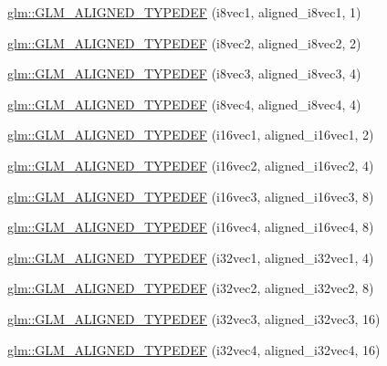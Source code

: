 \begin{DoxyCompactItemize}
\item 
\hyperlink{group__gtx__type__aligned_ga9ec20fdfb729c702032da9378c79679f}{glm\-::\-G\-L\-M\-\_\-\-A\-L\-I\-G\-N\-E\-D\-\_\-\-T\-Y\-P\-E\-D\-E\-F} (i8vec1, aligned\-\_\-i8vec1, 1)
\item 
\hyperlink{group__gtx__type__aligned_ga25b3fe1d9e8d0a5e86c1949c1acd8131}{glm\-::\-G\-L\-M\-\_\-\-A\-L\-I\-G\-N\-E\-D\-\_\-\-T\-Y\-P\-E\-D\-E\-F} (i8vec2, aligned\-\_\-i8vec2, 2)
\item 
\hyperlink{group__gtx__type__aligned_ga2958f907719d94d8109b562540c910e2}{glm\-::\-G\-L\-M\-\_\-\-A\-L\-I\-G\-N\-E\-D\-\_\-\-T\-Y\-P\-E\-D\-E\-F} (i8vec3, aligned\-\_\-i8vec3, 4)
\item 
\hyperlink{group__gtx__type__aligned_ga1fe6fc032a978f1c845fac9aa0668714}{glm\-::\-G\-L\-M\-\_\-\-A\-L\-I\-G\-N\-E\-D\-\_\-\-T\-Y\-P\-E\-D\-E\-F} (i8vec4, aligned\-\_\-i8vec4, 4)
\item 
\hyperlink{group__gtx__type__aligned_gaa4161e7a496dc96972254143fe873e55}{glm\-::\-G\-L\-M\-\_\-\-A\-L\-I\-G\-N\-E\-D\-\_\-\-T\-Y\-P\-E\-D\-E\-F} (i16vec1, aligned\-\_\-i16vec1, 2)
\item 
\hyperlink{group__gtx__type__aligned_ga9d7cb211ccda69b1c22ddeeb0f3e7aba}{glm\-::\-G\-L\-M\-\_\-\-A\-L\-I\-G\-N\-E\-D\-\_\-\-T\-Y\-P\-E\-D\-E\-F} (i16vec2, aligned\-\_\-i16vec2, 4)
\item 
\hyperlink{group__gtx__type__aligned_gaaee91dd2ab34423bcc11072ef6bd0f02}{glm\-::\-G\-L\-M\-\_\-\-A\-L\-I\-G\-N\-E\-D\-\_\-\-T\-Y\-P\-E\-D\-E\-F} (i16vec3, aligned\-\_\-i16vec3, 8)
\item 
\hyperlink{group__gtx__type__aligned_ga49f047ccaa8b31fad9f26c67bf9b3510}{glm\-::\-G\-L\-M\-\_\-\-A\-L\-I\-G\-N\-E\-D\-\_\-\-T\-Y\-P\-E\-D\-E\-F} (i16vec4, aligned\-\_\-i16vec4, 8)
\item 
\hyperlink{group__gtx__type__aligned_ga904e9c2436bb099397c0823506a0771f}{glm\-::\-G\-L\-M\-\_\-\-A\-L\-I\-G\-N\-E\-D\-\_\-\-T\-Y\-P\-E\-D\-E\-F} (i32vec1, aligned\-\_\-i32vec1, 4)
\item 
\hyperlink{group__gtx__type__aligned_gaf90651cf2f5e7ee2b11cfdc5a6749534}{glm\-::\-G\-L\-M\-\_\-\-A\-L\-I\-G\-N\-E\-D\-\_\-\-T\-Y\-P\-E\-D\-E\-F} (i32vec2, aligned\-\_\-i32vec2, 8)
\item 
\hyperlink{group__gtx__type__aligned_ga7354a4ead8cb17868aec36b9c30d6010}{glm\-::\-G\-L\-M\-\_\-\-A\-L\-I\-G\-N\-E\-D\-\_\-\-T\-Y\-P\-E\-D\-E\-F} (i32vec3, aligned\-\_\-i32vec3, 16)
\item 
\hyperlink{group__gtx__type__aligned_gad2ecbdea18732163e2636e27b37981ee}{glm\-::\-G\-L\-M\-\_\-\-A\-L\-I\-G\-N\-E\-D\-\_\-\-T\-Y\-P\-E\-D\-E\-F} (i32vec4, aligned\-\_\-i32vec4, 16)

\end{DoxyCompactItemize}
